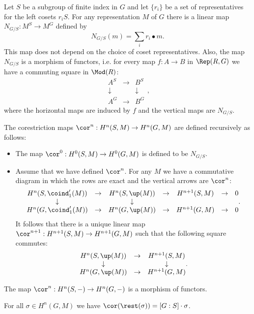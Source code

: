 \begin{definition} \label{def:corestriction}

	Let $S$ be a subgroup of finite index in $G$ and let $\{r_i\}$
	be a set of representatives for the left cosets $r_i S$.
	For any representation $M$ of $G$ there is a linear map $N_{G/S} : M^S \to M^G$
	defined by
	\[
		N_{G/S}(m) = \sum_i r_i \bullet m.
	\]
	This map does not depend on the choice of coset representatives.
	Also, the map $N_{G/S}$ is a morphism of functors, i.e. for every map $f : A \to B$ in
	$\Rep(R,G)$ we have a commuting square in $\Mod(R)$:
	\[
		\begin{matrix}
			A^S & \to & B^S \\
			\downarrow && \downarrow \\
			A^G & \to & B^G
		\end{matrix},
	\]
	where the horizontal maps are induced by $f$ and the vertical maps are $N_{G/S}$.

	The corestriction maps $\cor^n : H^n(S,M) \to H^n(G,M)$ are defined recursively as follows:
	\begin{itemize}
		\item
		The map $\cor^0 : H^0(S,M) \to H^0(G,M)$ is defined to be $N_{G/S}$.
		\item
		Assume that we have defined $\cor^n$. For any $M$ we have a commutative diagram
		in which the rows are exact and the vertical arrows are $\cor^n$:
		\[
			\begin{matrix}
				H^n(S,\coind_1'(M)) & \to & H^n(S,\up(M)) & \to &H^{n+1}(S,M) & \to & 0 \\
				\downarrow &&\downarrow \\
				H^n(G,\coind_1'(M)) & \to & H^n(G,\up(M)) & \to &H^{n+1}(G,M) & \to & 0
			\end{matrix}.
		\]
		It follows that there is a unique linear map $\cor^{n+1} : H^{n+1}(S,M) \to H^{n+1}(G,M)$
		such that the following square commutes:
		\[
			\begin{matrix}
				H^n(S,\up(M)) & \to & H^{n+1}(S,M) \\
				\downarrow &&\downarrow \\
				H^n(G,\up(M)) & \to &H^{n+1}(G,M)
			\end{matrix}.
		\]
	\end{itemize}
	The map $\cor^{n} : H^n(S , -) \to H^n(G,-)$ is a morphism of functors.
\end{definition}

\begin{lemma} \label{lem:cor comp rest}
	For all $\sigma \in H^n(G,M)$ we have
	\(\cor(\rest(\sigma)) = [G:S] \cdot \sigma\).
\end{lemma}

